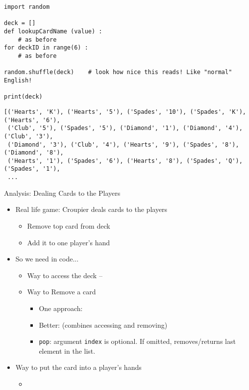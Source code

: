 \begin{frame}[fragile]
%
\begin{codebox}
\begin{verbatim}
import random

deck = []
def lookupCardName (value) :
    # as before
for deckID in range(6) :
    # as before

random.shuffle(deck)    # look how nice this reads! Like "normal" English!

print(deck)
\end{verbatim}
\end{codebox}
%
\begin{cmdbox}
\begin{verbatim}
[('Hearts', 'K'), ('Hearts', '5'), ('Spades', '10'), ('Spades', 'K'), ('Hearts', '6'),
 ('Club', '5'), ('Spades', '5'), ('Diamond', '1'), ('Diamond', '4'), ('Club', '3'), 
 ('Diamond', '3'), ('Club', '4'), ('Hearts', '9'), ('Spades', '8'), ('Diamond', '8'), 
 ('Hearts', '1'), ('Spades', '6'), ('Hearts', '8'), ('Spades', 'Q'), ('Spades', '1'), 
 ...
\end{verbatim}
\end{cmdbox}
%
\end{frame}


\begin{frame}[fragile]{Analysis: Dealing Cards to the Players}
%
\begin{itemize}
\item Real life game: Croupier deals cards to the players
	\begin{itemize}
	\item Remove top card from deck
	\item Add it to one player's hand
	\end{itemize}
\item So we need in code...
	\begin{itemize}
	\item Way to access the deck -- 
	\item Way to Remove a card
		\begin{itemize}
		\item One approach: 
		\item Better:  (combines accessing and removing)
		\item \texttt{pop}: argument \texttt{index} is optional. If omitted, removes/returns last element in the list.
		\end{itemize}
	\end{itemize}
\item Way to put the card into a player's hands
	\begin{itemize}
	\item {}
	\end{itemize}
\end{itemize}
%
\end{frame}


